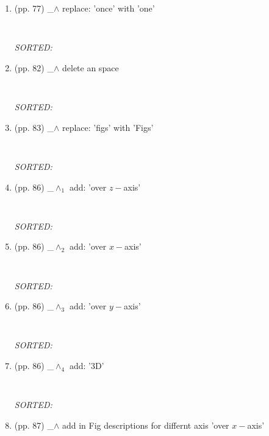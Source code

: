 \documentclass[12pt]{article}
\begin{document}
\begin{enumerate}
\item  (pp. 77)  \_$\wedge$  
	replace: 'once' with 'one'	
	\begin{verbatim}
	
	\end{verbatim}
	\textit{
	SORTED:  
	}
	\\

\item  (pp. 82)  \_$\wedge$  
	delete an space
	\begin{verbatim}
	
	\end{verbatim}
	\textit{
	SORTED:  
	}
	\\

\item  (pp. 83)  \_$\wedge$  
	replace: 'figs' with 'Figs'
	\begin{verbatim}
	
	\end{verbatim}
	\textit{
	SORTED:  
	}
	\\

\item  (pp. 86)  \_$\wedge_1$  
	add: 'over $z-$axis'
	\begin{verbatim}
	
	\end{verbatim}
	\textit{
	SORTED:  
	}
	\\


\item  (pp. 86)  \_$\wedge_2$  	
	add: 'over $x-$axis'
	\begin{verbatim}
	
	\end{verbatim}
	\textit{
	SORTED:  
	}
	\\

\item  (pp. 86)  \_$\wedge_3$  
	add: 'over $y-$axis'
	\begin{verbatim}
	
	\end{verbatim}
	\textit{
	SORTED:  
	}
	\\

\item  (pp. 86)  \_$\wedge_4$  
	add: '3D'
	\begin{verbatim}
	
	\end{verbatim}
	\textit{
	SORTED:  
	}
	\\


\item  (pp. 87)  \_$\wedge$  
	add in Fig descriptions for differnt axis
	'over $x-$axis'
	\begin{verbatim}
	

\end{verbatim}
\end{enumerate}
\end{document}
